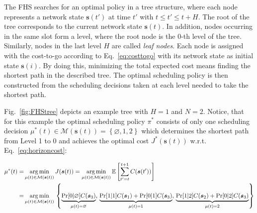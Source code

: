 The FHS searches for an optimal policy in a tree structure, where each node
represents a network state $\boldsymbol{s}(t')$ at time $t'$ with $t \leq t'
\leq t+H$. The root of the tree corresponds to the current network state
$\boldsymbol{s}(t)$. In addition, nodes occurring in the same slot form a level,
where the root node is the 0-th level of the tree. Similarly, nodes in the last
level $H$ are called \textit{leaf nodes}. Each node is assigned with the
cost-to-go according to Eq.~\eqref{eq:costtogo} with its network state as
initial state $\boldsymbol{s}(i)$. By doing this, minimizing the total expected
cost means finding the shortest path in the described tree. The optimal
scheduling policy is then constructed from the scheduling decisions taken at
each level needed to take the shortest path.

Fig.~\ref{fig:FHStree} depicts an example tree with $H=1$ and $N=2$. Notice,
that for this example the optimal scheduling policy $\pi^*$ consists of only one
scheduling decision $\mu^*(t) \in \mathcal{M}(\boldsymbol{s}(t)) =
\left\{\varnothing, 1, 2 \right\}$ which determines the shortest path from Level
1 to 0 and achieves the optimal cost $J^*(\boldsymbol{s}(t))$ w.r.t.
Eq.~\eqref{eq:horizoncost}:

\begin{align*}
    \mu^*(t) =& \operatorname*{arg\,min}_{\mu(t)\in\mathcal{M}(\boldsymbol{s}(t))}{J(\boldsymbol{s}(t))}
    = \operatorname*{arg\,min}_{\mu(t)\in\mathcal{M}(\boldsymbol{s}(t))}{\mathbb{E} \left[ \sum_{t' = t }^{t + 1} C(\boldsymbol{s}(t')) \right]} \\
    =& \operatorname*{arg\,min}_{\mu(t)\in\mathcal{M}(\boldsymbol{s}(t))}{} \left\{
      \underbrace{\Pr[0|\varnothing] C(\boldsymbol{s}_3)}_{\mu(t)=\varnothing}, \,
      \underbrace{\Pr[1|1] C(\boldsymbol{s}_1) + \Pr[0|1] C(\boldsymbol{s}_3)}_{\mu(t)=1}, \,
      \underbrace{\Pr[1|2] C(\boldsymbol{s}_2) + \Pr[0|2] C(\boldsymbol{s}_3)}_{\mu(t)=2} \right\}
\end{align*}


